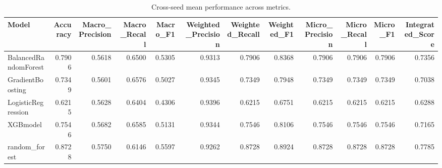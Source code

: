 \begin{table}[t]
\centering
\begin{tabular}{lrrrrrrrrrrr}
\toprule
Model & Accuracy & Macro_Precision & Macro_Recall & Macro_F1 & Weighted_Precision & Weighted_Recall & Weighted_F1 & Micro_Precision & Micro_Recall & Micro_F1 & Integrated_Score \\
\midrule
BalancedRandomForest & 0.7906 & 0.5618 & 0.6500 & 0.5305 & 0.9313 & 0.7906 & 0.8368 & 0.7906 & 0.7906 & 0.7906 & 0.7356 \\
GradientBoosting & 0.7349 & 0.5601 & 0.6576 & 0.5027 & 0.9345 & 0.7349 & 0.7948 & 0.7349 & 0.7349 & 0.7349 & 0.7038 \\
LogisticRegression & 0.6215 & 0.5628 & 0.6404 & 0.4306 & 0.9396 & 0.6215 & 0.6751 & 0.6215 & 0.6215 & 0.6215 & 0.6288 \\
XGBmodel & 0.7546 & 0.5682 & 0.6585 & 0.5131 & 0.9344 & 0.7546 & 0.8106 & 0.7546 & 0.7546 & 0.7546 & 0.7165 \\
random_forest & 0.8728 & 0.5750 & 0.6146 & 0.5597 & 0.9262 & 0.8728 & 0.8924 & 0.8728 & 0.8728 & 0.8728 & 0.7785 \\
\bottomrule
\end{tabular}
\caption{Cross-seed mean performance across metrics.}
\label{tab:cross_seed_mean}
\end{table}